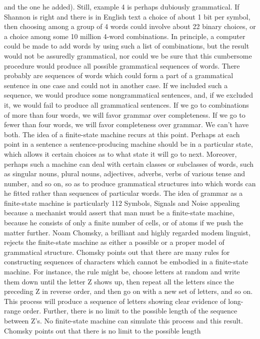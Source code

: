 {{{and the one he added). Still, example 4 is perhaps dubiously
grammatical.
If Shannon is right and there is in English text a choice of about
1 bit per symbol, then choosing among a group of 4 words could
involve about 22 binary choices, or a choice among some 10 million
4-word combinations. In principle, a computer could be made
to add words by using such a list of combinations, but the result
would not be assuredly grammatical, nor could we be sure that
this cumbersome procedure would produce all possible grammatical
sequences of words. There probably are sequences of words
which could form a part of a grammatical sentence in one case
and could not in another case. If we included such a sequence, we
would produce some nongrammatical sentences, and, if we excluded
it, we would fail to produce all grammatical sentences.
If we go to combinations of more than four words, we will favor
grammar over completeness. If we go to fewer than four words,
we will favor completeness over grammar. We can’t have both.
The idea of a finite-state machine recurs at this point. Perhaps
at each point in a sentence a sentence-producing machine should
be in a particular state, which allows it certain choices as to what
state it will go to next. Moreover, perhaps such a machine can deal
with certain classes or subclasses of words, such as singular nouns,
plural nouns, adjectives, adverbs, verbs of various tense and number,
and so on, so as to produce grammatical structures into which
words can he fitted rather than sequences of particular words.
The idea of grammar as a finite-state machine is particularly
112
Symbols, Signals and Noise
appealing because a mechanist would assert that man must be a
finite-state machine, because he consists of only a finite number
of cells, or of atoms if we push the matter further.
Noam Chomsky, a brilliant and highly regarded modem linguist,
rejects the finite-state machine as either a possible or a proper
model of grammatical structure. Chomsky points out that there
are many rules for constructing sequences of characters which cannot
be embodied in a finite-state machine. For instance, the rule
might be, choose letters at random and write them down until the
letter Z shows up, then repeat all the letters since the preceding Z
in reverse order, and then go on with a new set of letters, and so
on. This process will produce a sequence of letters showing clear
evidence of long-range order. Further, there is no limit to the possible
length of the sequence between Z’s. No finite-state machine
can simulate this process and this result.
Chomsky points out that there is no limit to the possible length
}}}
